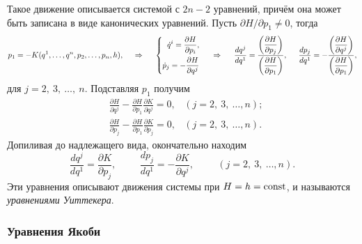 Такое движение описывается системой с $2n-2$ уравнений, причём она может быть записана в виде канонических уравнений. Пусть $\partial H / \partial p_1 \neq 0$, тогда
\begin{equation*}
    p_1 = - K(q^1, \ldots, q^n, p_2, \ldots, p_n, h),
    \hspace{0.5cm} \Rightarrow \hspace{0.5cm} 
    \left\{\begin{aligned}
        \dot{q}^i = \frac{\partial H}{\partial p_i}, \\
        \dot{p}_j = - \frac{\partial H}{\partial q^j}        
    \end{aligned}\right.
    \hspace{0.5cm} \Rightarrow \hspace{0.5cm} 
    \frac{d q^j}{d q^1} = \frac{
    \left(\dfrac{\partial H}{\partial p_j} \right)
    }{
    \left(\dfrac{\partial H}{\partial p_1} \right)
    },
    \hspace{0.5cm} 
    \frac{d p_j}{d q^1} = - \frac{
    \left(\dfrac{\partial H}{\partial q^j}\right)
    }{
    \left(\dfrac{\partial H}{\partial p_1} \right)
    },
\end{equation*}
для $j = 2,\ 3,\ \ldots,\ n$. Подставляя $p_1$ получим
\begin{align*}
    &\frac{\partial H}{\partial q^j} - \frac{\partial H}{\partial p_1} \frac{\partial K}{\partial q^j} = 0,
    &(j = 2, \ 3, \ \ldots, n);
    \\
    &\frac{\partial H}{\partial p_j} - \frac{\partial H}{\partial p_1} \frac{\partial K}{\partial p_j}  = 0,
    &(j = 2, \ 3, \ \ldots, n).
\end{align*}
Допиливая до надлежащего вида, окончательно находим
\begin{equation*}
    \frac{d q^j}{d q^1} = \frac{\partial K}{\partial p_j},
    \hspace{1cm} 
    \frac{d p_j}{d q^1} = - \frac{\partial K}{\partial q^j},
    \hspace{1cm} 
    (j = 2, \ 3, \ \ldots, n).
\end{equation*}
Эти уравнения описывают движения системы при $H = h = \text{const}$, и называются \textit{уравнениями Уиттекера}. 

\subsubsection*{Уравнения Якоби}


